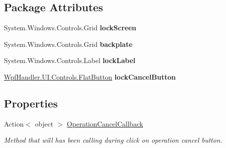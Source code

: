 \subsection*{Package Attributes}
\begin{DoxyCompactItemize}
\item 
\mbox{\label{class_wpf_handler_1_1_u_i_1_1_controls_1_1_lock_screen_a70df15cf031c4b8b17660091f35eaf5c}} 
System.\+Windows.\+Controls.\+Grid {\bfseries lock\+Screen}
\item 
\mbox{\label{class_wpf_handler_1_1_u_i_1_1_controls_1_1_lock_screen_a567f1855147e8635ebd8980dc6da744b}} 
System.\+Windows.\+Controls.\+Grid {\bfseries backplate}
\item 
\mbox{\label{class_wpf_handler_1_1_u_i_1_1_controls_1_1_lock_screen_a0bc49ea590c0e024d2d6fa2ee6bff68c}} 
System.\+Windows.\+Controls.\+Label {\bfseries lock\+Label}
\item 
\mbox{\label{class_wpf_handler_1_1_u_i_1_1_controls_1_1_lock_screen_a685dc9d63cfe051b2dd651d474402163}} 
\mbox{\hyperlink{class_wpf_handler_1_1_u_i_1_1_controls_1_1_flat_button}{Wpf\+Handler.\+U\+I.\+Controls.\+Flat\+Button}} {\bfseries lock\+Cancel\+Button}
\end{DoxyCompactItemize}
\subsection*{Properties}
\begin{DoxyCompactItemize}
\item 
Action$<$ object $>$ \mbox{\hyperlink{class_wpf_handler_1_1_u_i_1_1_controls_1_1_lock_screen_a43e0275f123b6e3d5dcf2f9032a67e82}{Operation\+Cancel\+Callback}}
\begin{DoxyCompactList}\small\item\em Method that will has been calling during click on operation cancel button. \end{DoxyCompactList}\end{DoxyCompactItemize}
